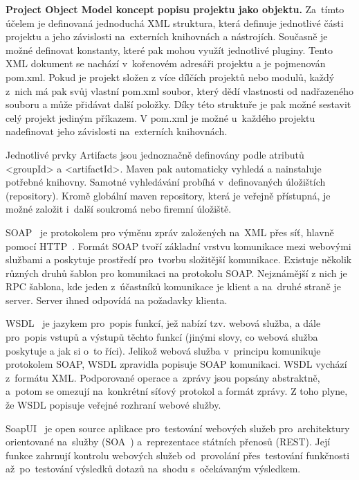 \textbf{Project Object Model koncept popisu projektu jako objektu.} Za~tímto účelem je definovaná jednoduchá XML struktura, která definuje jednotlivé části projektu a jeho závislosti na~externích knihovnách a nástrojích. Současně je možné definovat konstanty, které pak mohou využít jednotlivé pluginy. Tento XML dokument se nachází v~kořenovém adresáři projektu a je pojmenován pom.xml. Pokud je projekt složen z více dílčích projektů nebo modulů, každý z~nich má pak svůj vlastní pom.xml soubor, který dědí vlastnosti od nadřazeného souboru a může přidávat další položky. Díky této struktuře je pak možné sestavit celý projekt jediným příkazem. V pom.xml je možné u~každého projektu nadefinovat jeho závislosti na~externích knihovnách. 

Jednotlivé prvky Artifacts jsou jednoznačně definovány podle atributů <groupId> a <artifactId>. Maven pak automaticky vyhledá a nainstaluje potřebné knihovny. Samotné vyhledávání probíhá v~definovaných úložištích (repository). Kromě globální maven repository, která je veřejně přístupná, je možné založit i~další soukromá nebo firemní úložiště.

SOAP~\cite{soap} je protokolem pro výměnu zpráv založených na~XML přes síť, hlavně pomocí HTTP~\cite{http}. Formát SOAP tvoří základní vrstvu komunikace mezi webovými službami a poskytuje prostředí pro~tvorbu složitější komunikace. Existuje několik různých druhů šablon pro komunikaci na protokolu SOAP. Nejznámější z nich je RPC šablona, kde jeden z~účastníků komunikace je klient a na~druhé straně je server. Server ihned odpovídá na požadavky klienta.

WSDL~\cite{wsdl} je jazykem pro~popis funkcí, jež nabízí tzv. webová služba, a dále pro~popis vstupů a výstupů těchto funkcí (jinými slovy, co webová služba poskytuje a jak si o~to říci). Jelikož webová služba v~principu komunikuje protokolem SOAP, WSDL zpravidla popisuje SOAP komunikaci. WSDL vychází z~formátu XML. Podporované operace a~zprávy jsou popsány abstraktně, a~potom se omezují na~konkrétní síťový protokol a formát zprávy. Z toho plyne, že WSDL popisuje veřejné rozhraní webové služby.

SoapUI~\cite{soapui} je open source aplikace pro~testování webových služeb pro~architektury orientované na~služby (SOA~\cite{soa}) a~reprezentace státních přenosů (REST). Její funkce zahrnují kontrolu webových služeb od~provolání přes~testování funkčnosti až~po~testování výsledků dotazů na~shodu s~očekávaným výsledkem.

